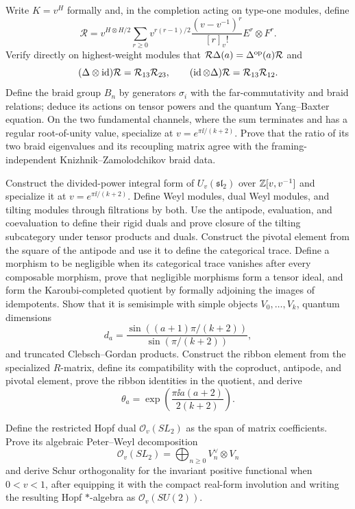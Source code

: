 \begin{exercise}
Write $K=v^H$ formally and, in the completion acting on type-one modules,
define
\[
 \mathcal R=v^{H\otimes H/2}
 \sum_{r\ge0}v^{r(r-1)/2}
 \frac{(v-v^{-1})^r}{[r]_v!}E^r\otimes F^r.
\]
Verify directly on highest-weight modules that
$\mathcal R\Delta(a)=\Delta^{\rm op}(a)\mathcal R$ and
\[
 (\Delta\otimes\operatorname{id})\mathcal R=\mathcal R_{13}\mathcal R_{23},
 \qquad
 (\operatorname{id}\otimes\Delta)\mathcal R=\mathcal R_{13}\mathcal R_{12}.
\]
Define the braid group $B_n$ by generators
$\sigma_i$ with the far-commutativity and braid relations; deduce its actions
on tensor powers and the quantum Yang--Baxter equation.
On the two fundamental channels, where the sum terminates and has a regular
root-of-unity value, specialize at $v=e^{\pi\ii/(k+2)}$.  Prove that the
ratio of its two braid eigenvalues and its recoupling matrix agree with the
framing-independent Knizhnik--Zamolodchikov braid data.
\end{exercise}

\begin{exercise}
Construct the divided-power integral form of
$U_v(\mathfrak{sl}_2)$ over $\mathbb Z[v,v^{-1}]$ and specialize it at
$v=e^{\pi\ii/(k+2)}$.  Define Weyl modules, dual Weyl modules, and tilting
modules through filtrations by both.  Use the antipode, evaluation, and
coevaluation to define their rigid duals and prove closure of the tilting
subcategory under tensor products and duals.  Construct the pivotal element
from the square of the antipode and use it to define the categorical trace.
Define a morphism to be
negligible when its categorical trace vanishes after every composable
morphism, prove that negligible morphisms form a tensor ideal, and form the
Karoubi-completed quotient by formally adjoining the images of idempotents.
Show that it is semisimple with simple objects
$V_0,\ldots,V_k$, quantum dimensions
\[
 d_a=\frac{\sin((a+1)\pi/(k+2))}{\sin(\pi/(k+2))},
\]
and truncated Clebsch--Gordan products.  Construct the ribbon element from
the specialized $R$-matrix, define its compatibility with the coproduct,
antipode, and pivotal element, prove the ribbon identities in the quotient,
and derive
\[
 \theta_a=\exp\!\left(\frac{\pi\ii a(a+2)}{2(k+2)}\right).
\]
\end{exercise}

\begin{exercise}
Define the restricted Hopf dual
$\mathcal O_v(SL_2)$ as the span of matrix coefficients.  Prove its algebraic
Peter--Weyl decomposition
\[
 \mathcal O_v(SL_2)=\bigoplus_{n\ge0}V_n^\vee\otimes V_n
\]
and derive Schur orthogonality for the invariant positive functional when
$0<v<1$, after equipping it with the compact real-form involution and writing
the resulting Hopf $*$-algebra as $\mathcal O_v(SU(2))$.
\end{exercise}

